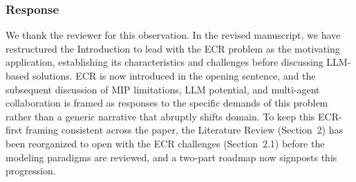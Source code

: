 \documentclass[11pt,a4paper]{article}
\begin{document}
\subsubsection{Response}
We thank the reviewer for this observation. In the revised manuscript, we have restructured the Introduction to lead with the ECR problem as the motivating application, establishing its characteristics and challenges before discussing LLM-based solutions. ECR is now introduced in the opening sentence, and the subsequent discussion of MIP limitations, LLM potential, and multi-agent collaboration is framed as responses to the specific demands of this problem rather than a generic narrative that abruptly shifts domain. To keep this ECR-first framing consistent across the paper, the Literature Review (Section~2) has been reorganized to open with the ECR challenges (Section~2.1) before the modeling paradigms are reviewed, and a two-part roadmap now signposts this progression.
\end{document}
